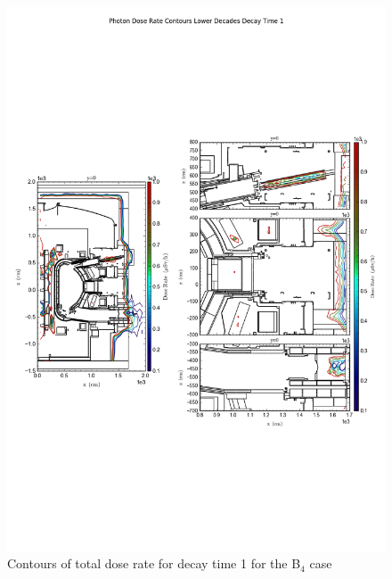 \documentclass[12pt]{article}
\begin{document}
\begin{figure}[ht!]
\centering
\includegraphics[trim={0cm 8cm, 0cm 8cm},clip,scale=0.75]{../plots/final_model_with_b4c/Photon_Dose_Rate_Contours_Lower_Decades_Decay_Time_1.png}
\caption{Contours of total dose rate for decay time 1 for the B$_4$ case}
\label{fig:photons_dc1_b4c_contours_l}
\end{figure}
\newpage
\clearpage
\end{document}
